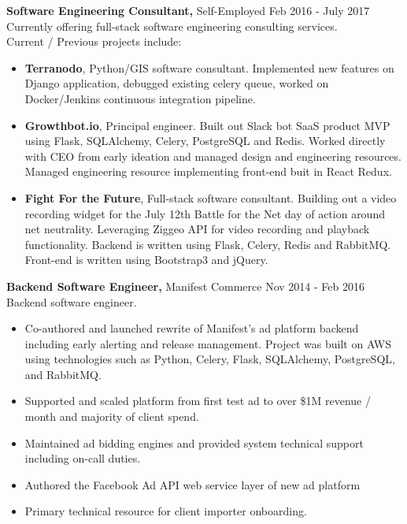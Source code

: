 \documentclass[margin]{res}
\begin{document}
\begin{resume}
  {\bf Software Engineering Consultant,} Self-Employed   \hfill Feb 2016 - July 2017\\
    Currently offering full-stack software engineering consulting services. \\
    Current / Previous projects include:
    \begin{itemize}
    \item {\bf Terranodo}, Python/GIS software consultant.  Implemented new features on Django application, debugged  existing celery queue, worked on Docker/Jenkins continuous integration pipeline.
    \item {\bf Growthbot.io}, Principal engineer.  Built out Slack bot SaaS product MVP using Flask, SQLAlchemy, Celery, PostgreSQL and Redis.  Worked directly with CEO from early ideation and managed design and engineering resources.  Managed engineering resource implementing front-end buit in React Redux.
    \item {\bf Fight For the Future}, Full-stack software consultant.  Building out a video recording widget for the July 12th Battle for the Net day of action around net neutrality.  Leveraging Ziggeo API for video recording and playback functionality.  Backend is written using Flask, Celery, Redis and RabbitMQ.  Front-end is written using Bootstrap3 and jQuery.
    \end{itemize}
  {\bf Backend Software Engineer,} Manifest Commerce \hfill Nov 2014 - Feb 2016\\
  Backend software engineer.
  \begin{itemize}
    \item Co-authored and launched rewrite of Manifest's ad platform backend including early alerting and release management.  Project was built on AWS using technologies such as Python, Celery, Flask, SQLAlchemy, PostgreSQL, and RabbitMQ.
    \item Supported and scaled platform from first test ad to over \$1M revenue / month and majority of client spend.
    \item Maintained ad bidding engines and provided system technical support including on-call duties.
    \item Authored the Facebook Ad API web service layer of new ad platform
    \item Primary technical resource for client importer onboarding.
  \end{itemize}


\end{resume}
\end{document}
